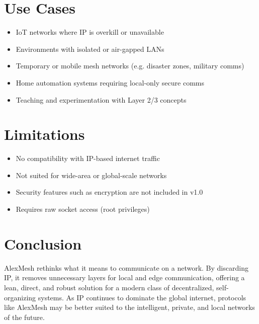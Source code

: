 \documentclass[11pt]{article}
\begin{document}
\section{Use Cases}
\begin{itemize}[noitemsep]
  \item IoT networks where IP is overkill or unavailable
  \item Environments with isolated or air-gapped LANs
  \item Temporary or mobile mesh networks (e.g. disaster zones, military comms)
  \item Home automation systems requiring local-only secure comms
  \item Teaching and experimentation with Layer 2/3 concepts
\end{itemize}

\section{Limitations}
\begin{itemize}[noitemsep]
  \item No compatibility with IP-based internet traffic
  \item Not suited for wide-area or global-scale networks
  \item Security features such as encryption are not included in v1.0
  \item Requires raw socket access (root privileges)
\end{itemize}

\section{Conclusion}
AlexMesh rethinks what it means to communicate on a network. By discarding IP, it removes unnecessary layers for local and edge communication, offering a lean, direct, and robust solution for a modern class of decentralized, self-organizing systems. As IP continues to dominate the global internet, protocols like AlexMesh may be better suited to the intelligent, private, and local networks of the future.
\end{document}

